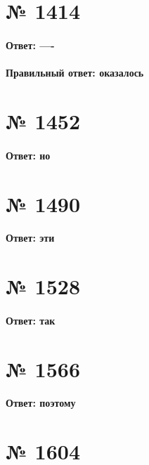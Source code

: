 \documentclass[11pt]{article} %
\begin{document}
\section{№ \textbf{1414}}

\paragraph{Ответ: ----}

\paragraph{Правильный ответ: \textbf{оказалось}}

\section{№ \textbf{1452}}

\paragraph{Ответ: \textbf{но}}

\section{№ \textbf{1490}}

\paragraph{Ответ: \textbf{эти}}

\section{№ \textbf{1528}}

\paragraph{Ответ: \textbf{так}}

\section{№ \textbf{1566}}

\paragraph{Ответ: \textbf{поэтому}}

\section{№ \textbf{1604}}
\end{document}

